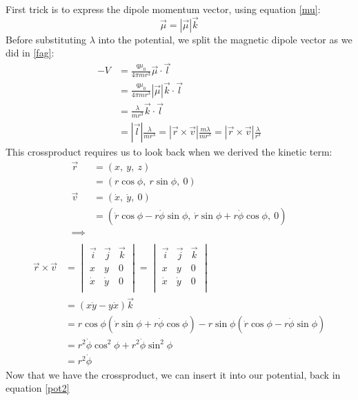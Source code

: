 \documentclass{report}
\begin{document}
First trick is to express the dipole momentum vector, using equation \ref{mu}:
\begin{equation} \vec{\mu} =|\vec\mu|\vec{k}\label{fag}\end{equation}
Before substituting $\lambda$ into the potential, we split the magnetic dipole vector as we did in \ref{fag}:
\begin{align}
-V &= \frac{q\mu_0}{4\pi mr^3}\vec{\mu}\cdot\vec{l} \nonumber\\
&= \frac{q\mu_0}{4\pi mr^3}|\vec{\mu}|\vec{k}\cdot\vec{l} \nonumber\\
&= \frac{\lambda}{mr^3}\vec{k}\cdot\vec{l} \nonumber\\\label{pot2}
&=|\vec{l}|\frac{\lambda}{mr^3} = |\vec r \times \vec v|\frac{m\lambda}{mr^3}=|\vec r \times \vec v|\frac{\lambda}{r^3}
\end{align}
This crossproduct requires us to look back when we derived the kinetic term:
\begin{align}
\vec r &=  (x, \ y,\ z)\nonumber\\
	   &= (r\cos \phi, \ r\sin \phi, \ 0)\\
\vec v &= (\dot x,\ \dot y, \ 0) \nonumber\\
	   &= (\dot{r}\cos{\phi} - r\dot{\phi}\sin{\phi}, \ \dot{r}\sin{\phi} + r\dot{\phi}\cos{\phi},\ 0)\\
\implies& \nonumber\\
\end{align}
\begin{align}
\vec r \times \vec v &= 
\begin{vmatrix}
\vec i&\vec j&\vec k\\
x&y&0\\
\dot x&\dot y&0\\
\end{vmatrix}
= 
\begin{vmatrix}
\vec i&\vec j&\vec k\\
x&y&0\\
\dot x&\dot y&0\\
\end{vmatrix}\\
&=(x\dot y - y \dot x)\vec k \nonumber \\
&= r\cos \phi (\dot{r}\sin{\phi} + r\dot{\phi}\cos{\phi}) -  r\sin \phi(\dot{r}\cos{\phi} - r\dot{\phi}\sin{\phi}) \\
&= r^2\dot \phi\cos^2 \phi + r^2\dot \phi\sin^2 \phi\\
&= r^2\dot \phi
\end{align}
Now that we have the crossproduct, we can insert it into our potential, back in equation \ref{pot2}
\end{document}
